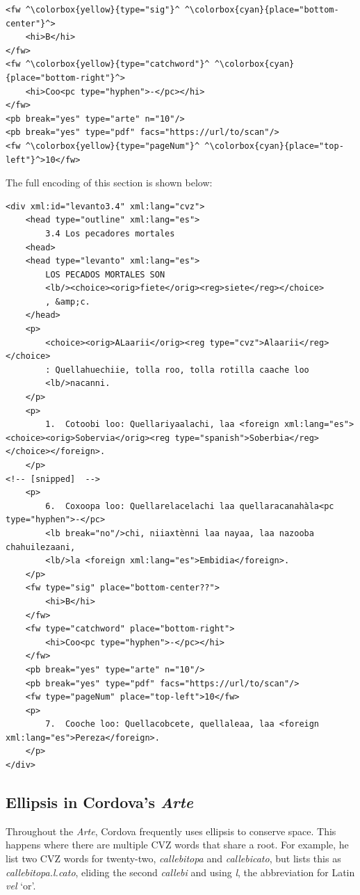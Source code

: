 \documentclass[12pt,a4paper]{article}
\begin{document}
\begin{lstlisting}
<fw ^\colorbox{yellow}{type="sig"}^ ^\colorbox{cyan}{place="bottom-center"}^>
	<hi>B</hi>
</fw>
<fw ^\colorbox{yellow}{type="catchword"}^ ^\colorbox{cyan}{place="bottom-right"}^>
	<hi>Coo<pc type="hyphen">-</pc></hi>
</fw>
<pb break="yes" type="arte" n="10"/>
<pb break="yes" type="pdf" facs="https://url/to/scan"/>
<fw ^\colorbox{yellow}{type="pageNum"}^ ^\colorbox{cyan}{place="top-left"}^>10</fw>
\end{lstlisting}

The full encoding of this section is shown below:

\begin{lstlisting}
<div xml:id="levanto3.4" xml:lang="cvz">
	<head type="outline" xml:lang="es">
		3.4 Los pecadores mortales
	<head>
	<head type="levanto" xml:lang="es">
		LOS PECADOS MORTALES SON
		<lb/><choice><orig>fiete</orig><reg>siete</reg></choice>
		, &amp;c.
	</head>
	<p>
		<choice><orig>ALaarii</orig><reg type="cvz">Alaarii</reg></choice>
		: Quellahuechiie, tolla roo, tolla rotilla caache loo
		<lb/>nacanni.
	</p>
	<p>
		1.  Cotoobi loo: Quellariyaalachi, laa <foreign xml:lang="es"><choice><orig>Sobervia</orig><reg type="spanish">Soberbia</reg></choice></foreign>.
	</p>
<!-- [snipped]  -->
	<p>
		6.  Coxoopa loo: Quellarelacelachi laa quellaracanahàla<pc type="hyphen">-</pc>
		<lb break="no"/>chi, niiaxtènni laa nayaa, laa nazooba chahuilezaani,
		<lb/>la <foreign xml:lang="es">Embidia</foreign>.
	</p>
	<fw type="sig" place="bottom-center??">
		<hi>B</hi>
	</fw>
	<fw type="catchword" place="bottom-right">
		<hi>Coo<pc type="hyphen">-</pc></hi>
	</fw>
	<pb break="yes" type="arte" n="10"/>
	<pb break="yes" type="pdf" facs="https://url/to/scan"/>
	<fw type="pageNum" place="top-left">10</fw>
	<p>
		7.  Cooche loo: Quellacobcete, quellaleaa, laa <foreign xml:lang="es">Pereza</foreign>.
	</p>
</div>
\end{lstlisting}

\subsection{Ellipsis in Cordova's \emph{Arte}} \label{sec:arte-ellipsis}

Throughout the \emph{Arte}, Cordova frequently uses ellipsis to conserve space.  This happens where there are multiple CVZ words that share a root.  For example, he list two CVZ words for twenty-two, \emph{callebitopa} and \emph{callebicato}, but lists this as \emph{callebitopa.l.cato}, eliding the second \emph{callebi} and using \emph{l}, the abbreviation for Latin \emph{vel} `or'.
\end{document}
